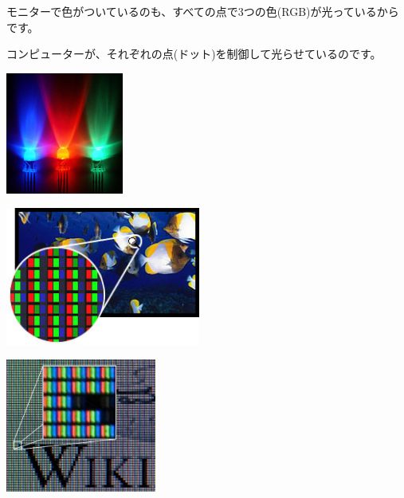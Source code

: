 \documentclass[a4paper,dvipdfmx]{jarticle}
\begin{document}
\bigskip


\bigskip


\bigskip


\bigskip


\bigskip


\bigskip


\bigskip


\bigskip


\bigskip


\bigskip


\bigskip

モニターで色がついているのも、すべての点で3つの色(RGB)が光っているからです。

コンピューターが、それぞれの点(ドット)を制御して光らせているのです。



\begin{center}
\includegraphics[width=3.854cm,height=3.988cm]{text02-img/text02-img033.jpg}

\end{center}
\begin{center}
\includegraphics[width=6.403cm,height=4.542cm]{text02-img/text02-img034.jpg}

\end{center}
\begin{center}
\includegraphics[width=4.948cm,height=4.383cm]{text02-img/text02-img035.jpg}

\end{center}
\end{document}
